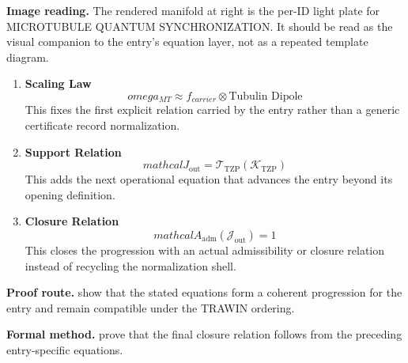 \begin{samepage}
\noindent\begin{minipage}[t]{0.45\linewidth}
\vspace{0pt}
\raggedright
\scriptsize\textbf{Image reading.} The rendered manifold at right is the per-ID light plate for MICROTUBULE QUANTUM SYNCHRONIZATION. It should be read as the visual companion to the entry's equation layer, not as a repeated template diagram.\par
\end{minipage}\hfill
\begin{minipage}[t]{0.53\linewidth}
\vspace*{-0.10in}
\raggedright
{}
\end{minipage}
\end{samepage}

\clearpage


\begin{enumerate}[leftmargin=1.6em,itemsep=9pt,topsep=6pt]
\item \textbf{Scaling Law}
\[
omega_{MT} \approx f_{carrier} \otimes \text{Tubulin Dipole}
\]
This fixes the first explicit relation carried by the entry rather than a generic certificate record normalization.

\item \textbf{Support Relation}
\[
mathcal{J}_{\mathrm{out}} = \mathcal{T}_{\mathrm{TZP}}\!\left(\mathcal{K}_{\mathrm{TZP}}\right)
\]
This adds the next operational equation that advances the entry beyond its opening definition.

\item \textbf{Closure Relation}
\[
mathcal{A}_{\mathrm{adm}}\!\left(\mathcal{J}_{\mathrm{out}}\right)=1
\]
This closes the progression with an actual admissibility or closure relation instead of recycling the normalization shell.
\end{enumerate}

\textbf{Proof route.} show that the stated equations form a coherent progression for the entry and remain compatible under the TRAWIN ordering.

\textbf{Formal method.} prove that the final closure relation follows from the preceding entry-specific equations.

\medskip
{}

